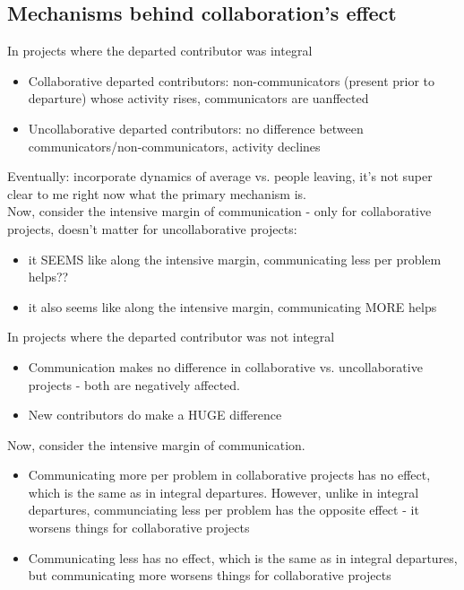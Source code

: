\documentclass[12pt,notitlepage]{article}
\begin{document}
\subsection{Mechanisms behind collaboration's effect}




In projects where the departed contributor was integral
\begin{itemize}
    \item Collaborative departed contributors: non-communicators (present prior to departure) whose activity rises, communicators are uanffected
    \item Uncollaborative departed contributors: no difference between communicators/non-communicators, activity declines
\end{itemize}
Eventually: incorporate dynamics of average vs. people leaving, it's not super clear to me right now what the primary mechanism is. \\
Now, consider the intensive margin of communication - only for collaborative projects, doesn't matter for uncollaborative projects:
\begin{itemize}
    \item it SEEMS like along the intensive margin, communicating less per problem helps??
    \item it also seems like along the intensive margin, communicating MORE helps
\end{itemize}



In projects where the departed contributor was not integral
\begin{itemize}
    \item Communication makes no difference in collaborative vs. uncollaborative projects - both are negatively affected. 
    \item New contributors do make a HUGE difference
\end{itemize}

Now, consider the intensive margin of communication.
\begin{itemize}
    \item Communicating more per problem in collaborative projects has no effect, which is the same as in integral departures. However, unlike in integral departures, communciating less per problem has the opposite effect - it worsens things for collaborative projects
    \item Communicating less has no effect, which is the same as in integral departures, but communicating more worsens things for collaborative projects 
\end{itemize}
\end{document}
